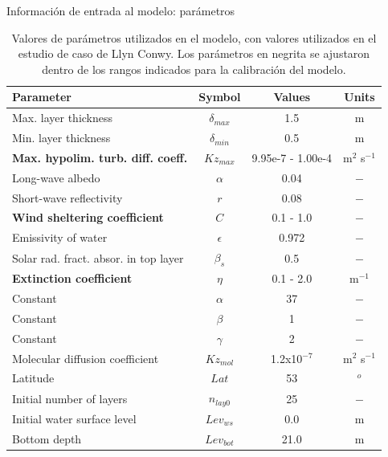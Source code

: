 \documentclass[
10pt,
aspectratio=169,
]{beamer}
\begin{document}
\begin{frame}{Información de entrada al modelo: parámetros}
\vspace{-0.4cm}
\begin{table}
\footnotesize
\centering
\caption{Valores de parámetros utilizados en el modelo, con valores utilizados en el estudio de caso de Llyn Conwy. Los parámetros en negrita se ajustaron dentro de los rangos indicados para la calibración del modelo.}
\begin{tabular}{l c c c}
\toprule
 Parameter & Symbol & Values & Units \\
\midrule
 Max. layer thickness & $\delta_{max}$ & 1.5 & m\\
 Min. layer thickness & $\delta_{min}$ & 0.5 & m\\
 \textbf{Max. hypolim. turb. diff. coeff.} & $Kz_{max}$ & 9.95e-7 - 1.00e-4 & m$^2$ s$^{-1}$\\
 Long-wave albedo & $\alpha$  & 0.04 & $-$\\
 Short-wave reflectivity & $r$ & 0.08 & $-$\\
 \textbf{Wind sheltering coefficient} & $C$ & 0.1 - 1.0 & $-$\\
 Emissivity of water & $\epsilon$ & 0.972 & $-$\\
 Solar rad. fract. absor. in top layer & $\beta_{s}$ & 0.5 & $-$\\
 \textbf{Extinction coefficient} & $\eta$ & 0.1 - 2.0 & m$^{-1}$\\
 Constant & $\alpha$ & 37 & $-$\\
 Constant  & $\beta$  & 1  & $-$\\
 Constant  & $\gamma$ & 2  & $-$\\
 Molecular diffusion coefficient & $Kz_{mol}$ & 1.2x10$^{-7}$ & m$^2$ s$^{-1}$\\
 Latitude & $Lat$ &  53 & $^o$\\
 Initial number of layers &  $n_{lay0}$ & 25 & $-$\\
 Initial water surface level  & $Lev_{ws}$  & 0.0 & m\\
 Bottom depth & $Lev_{bot}$ & 21.0 & m\\
\bottomrule
\end{tabular}
\label{runparam}
\end{table}

\end{frame}
\end{document}

